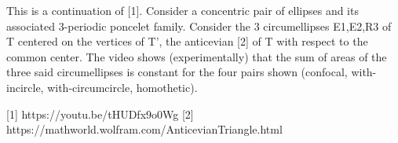 This is a continuation of [1]. Consider a concentric pair of ellipses and its associated 3-periodic poncelet family. Consider the 3 circumellipses E1,E2,R3 of T centered on the vertices of T', the anticevian [2] of T with respect to the common center. The video shows (experimentally) that the sum of areas of the three said circumellipses is constant for the four pairs shown (confocal, with-incircle, with-circumcircle, homothetic).

[1] https://youtu.be/tHUDfx9o0Wg
[2] https://mathworld.wolfram.com/AnticevianTriangle.html